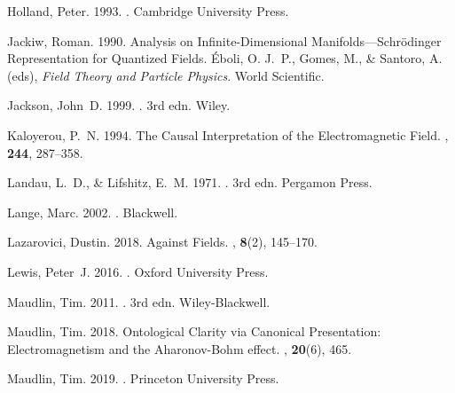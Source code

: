 \documentclass[onecolumn,secnumarabic,amsmath,amssymb,balancelastpage,nofootinbib]{article}
\begin{document}
\begin{thebibliography}{}
Holland, Peter. 1993.
.
\newblock Cambridge University Press.

Jackiw, Roman. 1990.
\newblock Analysis on Infinite-Dimensional Manifolds---Schr\"{o}dinger
  Representation for Quantized Fields.
 \'{E}boli, O. J.~P., Gomes, M., \& Santoro,
  A. (eds), {\em Field Theory and Particle Physics}.
\newblock World Scientific.

Jackson, John~D. 1999.
. 3rd edn.
\newblock Wiley.

Kaloyerou, P.~N. 1994.
\newblock The Causal Interpretation of the Electromagnetic Field.
, {\bf 244}, 287--358.

Landau, L.~D., \& Lifshitz, E.~M. 1971.
. 3rd edn.
\newblock Pergamon Press.

Lange, Marc. 2002.
.
\newblock Blackwell.

Lazarovici, Dustin. 2018.
\newblock Against Fields.
, {\bf 8}(2),
  145--170.

Lewis, Peter~J. 2016.
.
\newblock Oxford University Press.

Maudlin, Tim. 2011.
. 3rd edn.
\newblock Wiley-Blackwell.

Maudlin, Tim. 2018.
\newblock Ontological Clarity via Canonical Presentation: Electromagnetism and
  the Aharonov-Bohm effect.
, {\bf 20}(6), 465.

Maudlin, Tim. 2019.
.
\newblock Princeton University Press.


\end{thebibliography}
\end{document}
